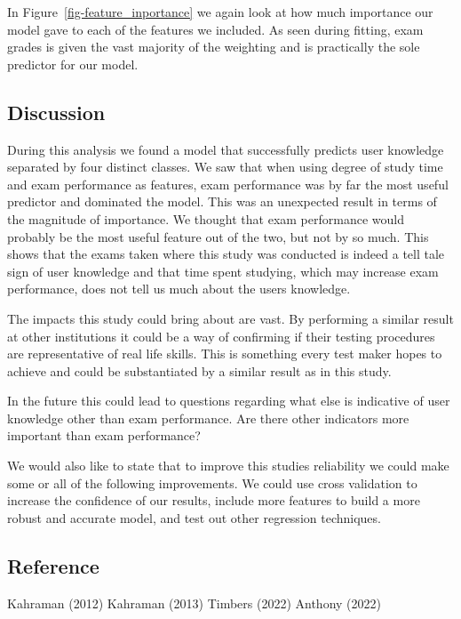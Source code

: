 \documentclass[
  letterpaper,
  DIV=11,
  numbers=noendperiod]{scrartcl}
\begin{document}
In Figure~\ref{fig-feature_inportance} we again look at how much
importance our model gave to each of the features we included. As seen
during fitting, exam grades is given the vast majority of the weighting
and is practically the sole predictor for our model.

\subsection{\texorpdfstring{\textbf{Discussion}}{Discussion}}\label{discussion}

During this analysis we found a model that successfully predicts user
knowledge separated by four distinct classes. We saw that when using
degree of study time and exam performance as features, exam performance
was by far the most useful predictor and dominated the model. This was
an unexpected result in terms of the magnitude of importance. We thought
that exam performance would probably be the most useful feature out of
the two, but not by so much. This shows that the exams taken where this
study was conducted is indeed a tell tale sign of user knowledge and
that time spent studying, which may increase exam performance, does not
tell us much about the users knowledge.

The impacts this study could bring about are vast. By performing a
similar result at other institutions it could be a way of confirming if
their testing procedures are representative of real life skills. This is
something every test maker hopes to achieve and could be substantiated
by a similar result as in this study.

In the future this could lead to questions regarding what else is
indicative of user knowledge other than exam performance. Are there
other indicators more important than exam performance?

We would also like to state that to improve this studies reliability we
could make some or all of the following improvements. We could use cross
validation to increase the confidence of our results, include more
features to build a more robust and accurate model, and test out other
regression techniques.

\subsection{\texorpdfstring{\textbf{Reference}}{Reference}}\label{reference}

Kahraman (2012) Kahraman (2013) Timbers (2022) Anthony (2022)
\end{document}
